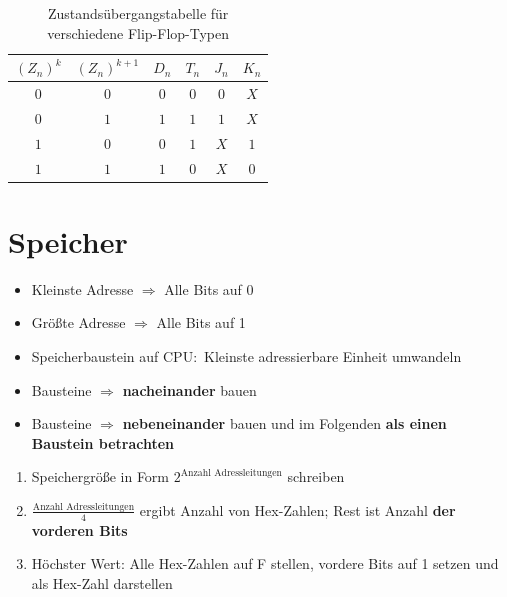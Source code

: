 \documentclass[a5paper,12pt,twoside]{scrartcl}
\begin{document}
\begin{table}[H]
  \centering
  \begin{tabular}{|cc|c|c|cc|}
    \hline
    \((Z_n)^k\) & \((Z_n)^{k+1}\)& \(D_n\) & \(T_n\) & \(J_n\) & \(K_n\)\\
    \hline \hline
    \(0\) & \(0\) & \(0\) & \(0\) & \(0\) & \(X\)\\ \hline
    \(0\) & \(1\) & \(1\) & \(1\) & \(1\) & \(X\)\\ \hline
    \(1\) & \(0\) & \(0\) & \(1\) & \(X\) & \(1\)\\ \hline
    \(1\) & \(1\) & \(1\) & \(0\) & \(X\) & \(0\)\\ \hline
  \end{tabular}
  \caption{Zustandsübergangstabelle für verschiedene Flip-Flop-Typen}
  \label{tab:FF}
\end{table}

\clearpage

\section{Speicher}

\begin{itemize}
\item Kleinste Adresse \(\Rightarrow\) Alle Bits auf 0
\item Größte Adresse \(\Rightarrow\) Alle Bits auf 1
\item Speicherbaustein auf CPU:\ Kleinste adressierbare Einheit umwandeln
\item {} Bausteine \(\Rightarrow\) \textbf{nacheinander} bauen
\item {} Bausteine \(\Rightarrow\) \textbf{nebeneinander} bauen und im Folgenden \textbf{als einen Baustein betrachten}
\end{itemize}

\begin{enumerate}
\item Speichergröße in Form \(2^{\text{Anzahl Adressleitungen}}\) schreiben
\item \(\frac{\text{Anzahl Adressleitungen}}{4}\) ergibt Anzahl von Hex-Zahlen; Rest ist Anzahl \textbf{der vorderen Bits}
\item Höchster Wert: Alle Hex-Zahlen auf \glqq{}F\grqq{} stellen, vordere Bits auf 1 setzen und als Hex-Zahl darstellen
\end{enumerate}
\end{document}
